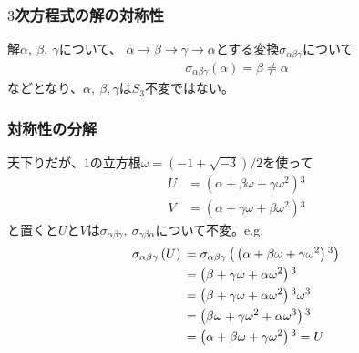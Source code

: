 \documentclass[12pt, t]{beamer}
\newcommand{\lr}[1]{\left({}#1\right){}}
\newcommand{\slr}[1]{\left[{}#1\right]{}}
\begin{document}
\begin{frame}
\frametitle{$3$次方程式}
$3$次方程式$x^3+bx^2+cx+d=0$についても、解を$\alpha,\ \beta,\ \gamma$として
\begin{align}
  b &= -(\alpha + \beta + \gamma) \\
  c &= \alpha \beta + \beta \gamma + \gamma \alpha \\
  d &= -\alpha \beta \gamma
\end{align}
であり、$b,\ c,\ d$は $\slr{\alpha \beta \gamma]$の置換$\sigma \in S_3$について不変。
\end{frame}

\begin{frame}
\frametitle{$3$次方程式の解の対称性}
解$\alpha,\ \beta,\ \gamma$について、
$\alpha \rightarrow \beta \rightarrow \gamma \rightarrow \alpha$とする変換$\sigma_{\alpha \beta \gamma}$について
\begin{align}
  \sigma_{\alpha \beta \gamma}(\alpha) = \beta \neq \alpha
\end{align}
などとなり、$\alpha,\ \beta, \gamma$は$S_3$不変ではない。
\end{frame}

\begin{frame}
\frametitle{対称性の分解}
天下りだが、$1$の立方根$\omega = (-1 + \sqrt{-3})/2$を使って
\begin{align}
  U &= \lr{\alpha + \beta \omega + \gamma \omega^2}^3 \\
  V &= \lr{\alpha + \gamma \omega + \beta \omega^2}^3
\end{align}
と置くと$U$と$V$は$\sigma_{\alpha \beta \gamma},\ \sigma_{\gamma \beta \alpha}$について不変。e.g.
\begin{align}
  \sigma_{\alpha \beta \gamma}\lr{U} &= \sigma_{\alpha \beta \gamma}\lr{\lr{\alpha + \beta \omega + \gamma \omega^2}^3} \notag \\
                                     &= \lr{\beta + \gamma \omega + \alpha \omega^2}^3 \notag \\
                                     &= \lr{\beta + \gamma \omega + \alpha \omega^2}^3 \omega^3 \notag \\
                                     &= \lr{\beta \omega + \gamma \omega^2 + \alpha \omega^3}^3 \notag \\
                                     &= \lr{\alpha + \beta \omega + \gamma \omega^2}^3 = U
\end{align}
\end{frame}
\end{document}
